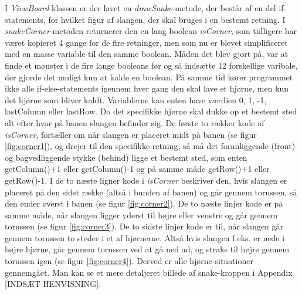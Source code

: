 \documentclass{report}
\begin{document}
I \textit{ViewBoard}-klassen er der lavet en \textit{drawSnake}-metode, der består af en del if-statements, for hvilket figur af slangen, der skal bruges i en bestemt retning. I \textit{snakeCorner}-metoden returnerer den en lang boolean \textit{isCorner}, som tidligere har været kopieret 4 gange for de fire retninger, men som nu er blevet simplificeret med en masse variable til den samme boolean. Måden det blev gjort på, var at finde et mønster i de fire lange booleans før og så indsætte 12 forskellige varibale, der gjorde det muligt kun at kalde en boolean. På samme tid kører programmet ikke alle if-else-statements igennem hver gang den skal lave et hjørne, men kun det hjørne som bliver kaldt. Variablerne kan enten have værdien 0, 1, -1, lastColumn eller lastRow. Da det specifikke hjørne skal dukke op et bestemt sted alt efter hvor på banen slangen befinder sig.
De første to rækker kode af \textit{isCorner}, fortæller om når slangen er placeret midt på banen (se figur \ref{fig:corner1}), og drejer til den specifikke retning, så må det foranliggende (front) og bagvedliggende stykke (behind) ligge et bestemt sted, som enten getColumn()+1 eller getColumn()-1 og på samme måde getRow()+1 eller getRow()-1. I de to næste ligner kode i \textit{isCorner} beskriver den, hvis slangen er placeret på den sidst række (altså i bunden af banen) og går gennem torussen, så den ender øverst i banen (se figur \ref{fig:corner2}).
De to næste linjer kode er på samme måde, når slangen ligger yderst til højre eller venstre og går gennem torussen (se figur \ref{fig:corner3}).
De to sidste linjer kode er til, når slangen går gennem torussen to steder i et af hjørnerne. Altså hvis slangen f.eks. er nede i højre hjørne, går gennem torussen ved at gå ned ad, og straks til højre gennem torussen igen (se figur \ref{fig:corner4}). 
Derved er alle hjørne-situationer gennemgået.
Man kan se et mere detaljeret billede af snake-kroppen i Appendix [INDSÆT HENVISNING].
\end{document}
